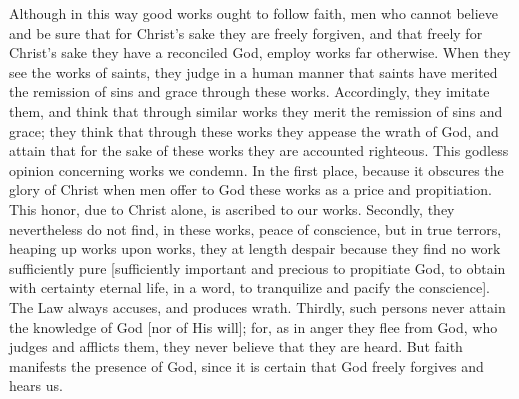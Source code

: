 Although in this way good works ought to follow faith, men who cannot
believe and be sure that for Christ's sake they are freely forgiven,
and that freely for Christ's sake they have a reconciled God, employ
works far otherwise.  When they see the works of saints, they judge
in a human manner that saints have merited the remission of sins and
grace through these works.  Accordingly, they imitate them, and think
that through similar works they merit the remission of sins and grace;
they think that through these works they appease the wrath of God,
and attain that for the sake of these works they are accounted
righteous.  This godless opinion concerning works we condemn.  In the
first place, because it obscures the glory of Christ when men offer
to God these works as a price and propitiation.  This honor, due to
Christ alone, is ascribed to our works.  Secondly, they nevertheless
do not find, in these works, peace of conscience, but in true terrors,
heaping up works upon works, they at length despair because they
find no work sufficiently pure [sufficiently important and precious
to propitiate God, to obtain with certainty eternal life, in a word,
to tranquilize and pacify the conscience].  The Law always accuses,
and produces wrath.  Thirdly, such persons never attain the knowledge
of God [nor of His will]; for, as in anger they flee from God, who
judges and afflicts them, they never believe that they are heard.
But faith manifests the presence of God, since it is certain that God
freely forgives and hears us.

